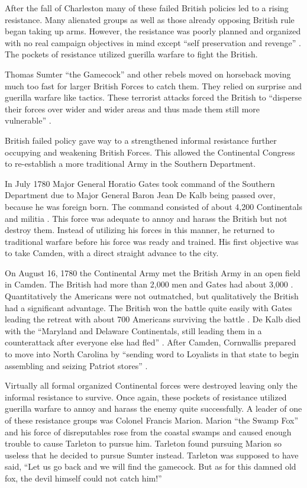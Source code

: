After the fall of Charleston many of these failed British policies led to a
rising resistance.  Many alienated groups as well as those already opposing
British rule began taking up arms.  However, the resistance was poorly planned
and organized with no real campaign objectives in mind except  ``self
preservation and revenge'' \cite[14]{weigley_partisan_1970}.  The pockets of
resistance utilized guerilla warfare to fight the British.  

Thomas Sumter ``the Gamecock'' and other rebels moved on horseback moving much
too fast for larger British Forces to catch them.  They relied on surprise and
guerilla warfare like tactics.  These terrorist attacks forced the British to
``disperse their forces over wider and wider areas and thus made them still
more vulnerable'' \cite[16]{weigley_partisan_1970}.

British failed policy gave way to a strengthened informal resistance further
occupying and weakening British Forces.  This allowed the Continental Congress
to re-establish a more traditional Army in the Southern Department.

In July 1780 Major General Horatio Gates took command of the Southern
Department due to Major General Baron Jean De Kalb being passed over, because
he was foreign born.  The command consisted of about 4,200 Continentals and
militia \cite[21]{moncure_cowpens_1996}.  This force was adequate to annoy and
harass the British but not destroy them.  Instead of utilizing his forces in
this manner, he returned to traditional warfare before his force was ready and
trained.  His first objective was to take Camden, with a direct straight
advance to the city. 

On August 16, 1780 the Continental Army met the British Army in an open field
in Camden.  The British had more than 2,000 men and Gates had about 3,000
\cite[19]{weigley_partisan_1970}.  Quantitatively the Americans were not
outmatched, but qualitatively the British had a significant advantage.  The
British won the battle quite easily with Gates leading the retreat with about
700 Americans surviving the battle \cite[21]{weigley_partisan_1970}.   De Kalb
died with the ``Maryland and Delaware Continentals, still leading them in a
counterattack after everyone else had fled'' \cite[21]{weigley_partisan_1970}.
After Camden, Cornwallis prepared to move into North Carolina by ``sending word
to Loyalists in that state to begin assembling and seizing Patriot stores''
\cite[27]{woodward_comparative_2002}.

Virtually all formal organized Continental forces were destroyed leaving only
the informal resistance to survive.  Once again, these pockets of resistance
utilized guerilla warfare to annoy and harass the enemy quite successfully.  A
leader of one of these resistance groups was Colonel Francis Marion.  Marion
``the Swamp Fox'' and his force of disreputables rose from the coastal swamps
and caused enough trouble to cause Tarleton to pursue him.  Tarleton found
pursuing Marion so useless that he decided to pursue Sumter instead.  Tarleton
was supposed to have said, ``Let us go back and we will find the gamecock.  But
as for this damned old fox, the devil himself could not catch him!'' \cite[23]{weigley_partisan_1970}

